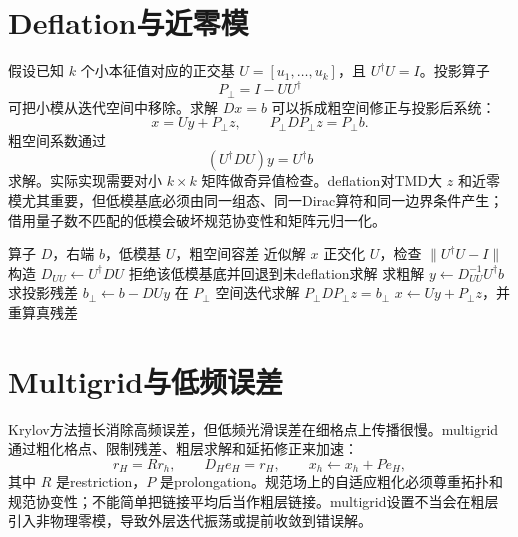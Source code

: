 \documentclass[UTF8,12pt,a4paper,twoside,openany]{ctexbook}
\begin{document}
\section{Deflation与近零模}

假设已知 \(k\) 个小本征值对应的正交基 \(U=[u_1,\ldots,u_k]\)，且 \(U^\dagger U=I\)。投影算子
\begin{equation}
  P_\perp=I-UU^\dagger
  \label{eq:deflation-projector}
\end{equation}
可把小模从迭代空间中移除。求解 \(Dx=b\) 可以拆成粗空间修正与投影后系统：
\begin{equation}
  x=Uy+P_\perp z,
  \qquad
  P_\perp D P_\perp z=P_\perp b.
  \label{eq:deflation-solve}
\end{equation}
粗空间系数通过
\begin{equation}
  (U^\dagger DU)y=U^\dagger b
  \label{eq:deflation-coarse}
\end{equation}
求解。实际实现需要对小 \(k\times k\) 矩阵做奇异值检查。deflation对TMD大 \(z\) 和近零模尤其重要，但低模基底必须由同一组态、同一Dirac算符和同一边界条件产生；借用量子数不匹配的低模会破坏规范协变性和矩阵元归一化。

\begin{algorithm}[htbp]
\caption{基于低模投影的deflation概念流程。}
\label{alg:deflation}
\begin{algorithmic}[1]
\Require 算子 \(D\)，右端 \(b\)，低模基 \(U\)，粗空间容差
\Ensure 近似解 \(x\)
\State 正交化 \(U\)，检查 \(\|U^\dagger U-I\|\)
\State 构造 \(D_{UU}\gets U^\dagger DU\)
  \State 拒绝该低模基底并回退到未deflation求解
\EndIf
\State 求粗解 \(y\gets D_{UU}^{-1}U^\dagger b\)
\State 求投影残差 \(b_\perp\gets b-DUy\)
\State 在 \(P_\perp\) 空间迭代求解 \(P_\perp DP_\perp z=b_\perp\)
\State \(x\gets Uy+P_\perp z\)，并重算真残差
\end{algorithmic}
\end{algorithm}

\section{Multigrid与低频误差}

Krylov方法擅长消除高频误差，但低频光滑误差在细格点上传播很慢。multigrid通过粗化格点、限制残差、粗层求解和延拓修正来加速：
\begin{equation}
  r_H=Rr_h,
  \qquad
  D_He_H=r_H,
  \qquad
  x_h\gets x_h+Pe_H,
  \label{eq:multigrid-cycle}
\end{equation}
其中 \(R\) 是restriction，\(P\) 是prolongation。规范场上的自适应粗化必须尊重拓扑和规范协变性；不能简单把链接平均后当作粗层链接。multigrid设置不当会在粗层引入非物理零模，导致外层迭代振荡或提前收敛到错误解。
\end{document}

